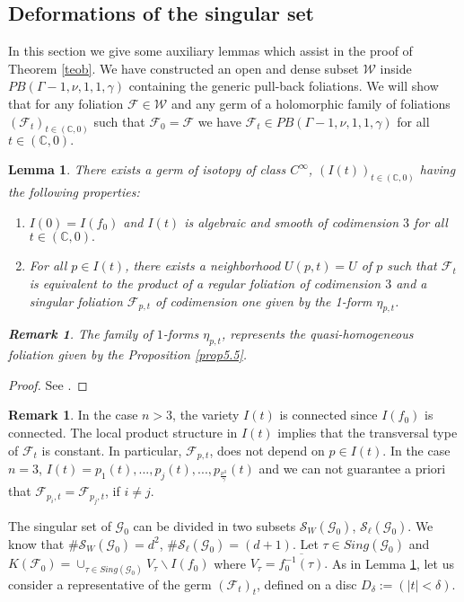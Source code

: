 \documentclass{amsart}
\newtheorem{lemma}[theorem]{Lemma}
\theoremstyle{definition}
\theoremstyle{proposition}
\newtheorem{remark}[theorem]{Remark}
\numberwithin{equation}{section}
\theoremstyle{main}
\begin{document}
\subsection{Deformations of the singular set}
In this section we give some auxiliary lemmas which assist in the proof of Theorem \ref{teob}. We have constructed an open and dense subset $\mathcal W$ inside {$PB(\Gamma-1,\nu,1,1,\gamma)$} containing the generic pull-back foliations.  We will show that for any foliation $\mathcal{F} \in \mathcal W$ and any germ of a holomorphic family of foliations $(\mathcal{F}_{t})_{t \in (\mathbb{C},0)}$ such that $\mathcal{F}_{0}=\mathcal{F}$ we have $\mathcal{F}_{t} \in PB(\Gamma-1,\nu,1,1,\gamma)$ for all $t \in (\mathbb{C},0).$
\begin{lemma} \label{Lemma5.8} There exists a germ of isotopy of class $C^{\infty}$, $(I(t))_{t \in (\mathbb {C},0)}$ having the following properties: 
   \begin{enumerate}
\item[(i)]  $I(0)=I(f_{0})$ and $I(t)$ is algebraic and smooth of codimension $3$ for all  ${t \in ({\mathbb {C}}, 0)}.$
 \item[(ii)] For all $p \in I(t)$, there exists a neighborhood $U(p,t)=U$ of $p$ such that $\mathcal{F}_{t}$ is equivalent to the product of a regular foliation of codimension $3$ and a singular foliation $\mathcal F_{p,t}$ of codimension one given by the 1-form $\eta_{p,t}$.
 \end{enumerate}
 \begin{remark}
The family of $1$-forms $\eta_{p,t}$, represents the quasi-homogeneous foliation given by the Proposition \ref{prop5.5}. 
  \end{remark}
\end{lemma}
 \begin{proof} See \cite[lema 2.3.2, p.81]{ln}.
 \end{proof}

 
\begin{remark}
In the case $n>3$, the variety $I(t)$ is connected since $I(f_{0})$ is connected. The local product structure in $I(t)$ implies that the transversal type of $\mathcal{F}_{t}$ is constant. In particular, $\mathcal F_{p,t}$, does not depend on $p \in I(t)$. In the case $n=3$, $I(t)=p_{1}(t),..., p_{j}(t),...,p_{\frac{\nu^{3}}{\gamma}}(t)$ and we can not guarantee a priori that $\mathcal F_{p_{i},t}=\mathcal F_{p_{j},t}$, if $i \neq j.$
\end{remark}
The singular set of  $\mathcal{G}_{0}$ can be divided in two subsets $\mathcal S_{W}(\mathcal G_{0})$,  $\mathcal S_{\ell}(\mathcal G_{0})$.  We know that  $\# \mathcal S_{W}(\mathcal G_{0})=d^{2}$, $\# \mathcal S_{\ell}(\mathcal G_{0})=(d+1)$.  Let $\tau \in Sing( \mathcal G_{0})$ and $K(\mathcal F_0)=\cup_{{\tau\in Sing( \mathcal G_{0})}}V_{\tau}\backslash I(f_{0})$ where $V_{\tau}=\overline{f_{0}^{-1}(\tau)}.$ 
As in Lemma \ref{Lemma5.8}, let us consider a representative of the germ $(\mathcal F_{t})_{t}$, defined on a disc $D_{\delta}:=(|t|<\delta).$ 
  
\end{document}

